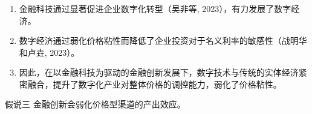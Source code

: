 \documentclass[12pt,aspectratio=169]{ctexbeamer}
\begin{document}
			\begin{frame}
				\frametitle{}
				\begin{enumerate}
					\justifying
					\normalsize
					\item 金融科技通过显著促进企业数字化转型（吴非等, 2023），有力发展了数字经济。
					\item 数字经济通过弱化价格粘性而降低了企业投资对于名义利率的敏感性（战明华和卢垚, 2023）。
					\item 因此，在以金融科技为驱动的金融创新发展下，数字技术与传统的实体经济紧密融合，提升了数字化产业对整体价格的调控能力，弱化了价格粘性。
				\end{enumerate}
				\centering
				\begin{minipage}{0.7\textwidth}
					\begin{block}{假说三}
						\fangsong 
						\justifying
						\hspace{2em}
						金融创新会弱化价格型渠道的产出效应。
					\end{block}
				\end{minipage}
			\end{frame}
			
\end{document}
